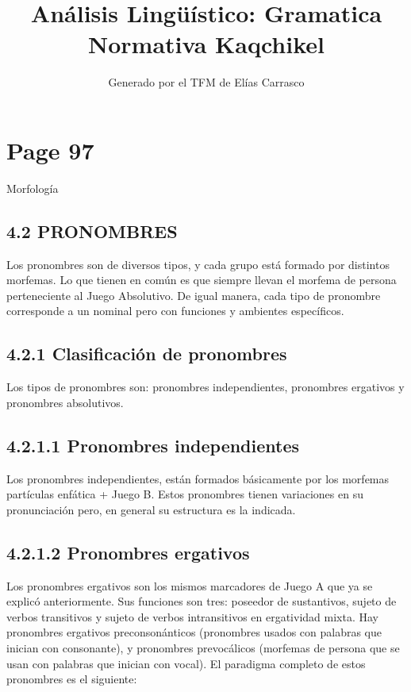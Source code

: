 \documentclass{article}%
\title{Análisis Lingüístico: Gramatica Normativa Kaqchikel}%
\author{Generado por el TFM de Elías Carrasco}%
\begin{document}
%
\normalsize%
\maketitle%
\section{Page 97}%
\label{sec:Page97}%
Morfología %
\subsection{4.2 PRONOMBRES}%
\label{subsec:4.2PRONOMBRES}%

%
Los pronombres son de diversos tipos, y cada grupo está formado por distintos %
morfemas. Lo que tienen en común es que siempre llevan el morfema de persona %
perteneciente al Juego Absolutivo. De igual manera, cada tipo de pronombre corresponde %
a un nominal pero con funciones y ambientes específicos. %
\subsection{4.2.1 Clasificación de pronombres}%
\label{subsec:4.2.1Clasificacindepronombres}%

%
Los tipos de pronombres son: pronombres independientes, pronombres ergativos y %
pronombres absolutivos. %
\subsection{4.2.1.1 Pronombres independientes}%
\label{subsec:4.2.1.1Pronombresindependientes}%

%
Los pronombres independientes, están formados básicamente por los morfemas %
partículas enfática + Juego B. Estos pronombres tienen variaciones en su %
pronunciación pero, en general su estructura es la indicada. %
\subsection{4.2.1.2 Pronombres ergativos}%
\label{subsec:4.2.1.2Pronombresergativos}%

%
Los pronombres ergativos son los mismos marcadores de Juego A que ya se %
explicó anteriormente. Sus funciones son tres: poseedor de sustantivos, sujeto de %
verbos transitivos y sujeto de verbos intransitivos en ergatividad mixta. Hay %
pronombres ergativos preconsonánticos (pronombres usados con palabras que inician %
con consonante), y pronombres prevocálicos (morfemas de persona que se usan con %
palabras que inician con vocal). El paradigma completo de estos pronombres es el %
siguiente: 

%
\end{document}
